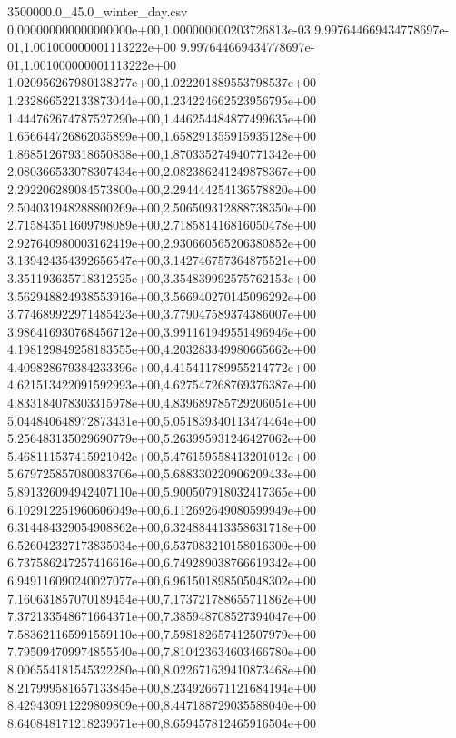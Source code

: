 \begin{filecontents*}{3500000.0_45.0_winter_day.csv}
0.000000000000000000e+00,1.000000000203726813e-03
9.997644669434778697e-01,1.001000000001113222e+00
9.997644669434778697e-01,1.001000000001113222e+00
1.020956267980138277e+00,1.022201889553798537e+00
1.232866522133873044e+00,1.234224662523956795e+00
1.444762674787527290e+00,1.446254484877499635e+00
1.656644726862035899e+00,1.658291355915935128e+00
1.868512679318650838e+00,1.870335274940771342e+00
2.080366533078307434e+00,2.082386241249878367e+00
2.292206289084573800e+00,2.294444254136578820e+00
2.504031948288800269e+00,2.506509312888738350e+00
2.715843511609798089e+00,2.718581416816050478e+00
2.927640980003162419e+00,2.930660565206380852e+00
3.139424354392656547e+00,3.142746757364875521e+00
3.351193635718312525e+00,3.354839992575762153e+00
3.562948824938553916e+00,3.566940270145096292e+00
3.774689922971485423e+00,3.779047589374386007e+00
3.986416930768456712e+00,3.991161949551496946e+00
4.198129849258183555e+00,4.203283349980665662e+00
4.409828679384233396e+00,4.415411789955214772e+00
4.621513422091592993e+00,4.627547268769376387e+00
4.833184078303315978e+00,4.839689785729206051e+00
5.044840648972873431e+00,5.051839340113474464e+00
5.256483135029690779e+00,5.263995931246427062e+00
5.468111537415921042e+00,5.476159558413201012e+00
5.679725857080083706e+00,5.688330220906209433e+00
5.891326094942407110e+00,5.900507918032417365e+00
6.102912251960606049e+00,6.112692649080599949e+00
6.314484329054908862e+00,6.324884413358631718e+00
6.526042327173835034e+00,6.537083210158016300e+00
6.737586247257416616e+00,6.749289038766619342e+00
6.949116090240027077e+00,6.961501898505048302e+00
7.160631857070189454e+00,7.173721788655711862e+00
7.372133548671664371e+00,7.385948708527394047e+00
7.583621165991559110e+00,7.598182657412507979e+00
7.795094709974855540e+00,7.810423634603466780e+00
8.006554181545322280e+00,8.022671639410873468e+00
8.217999581657133845e+00,8.234926671121684194e+00
8.429430911229809809e+00,8.447188729035588040e+00
8.640848171218239671e+00,8.659457812465916504e+00

\end{filecontents*}

